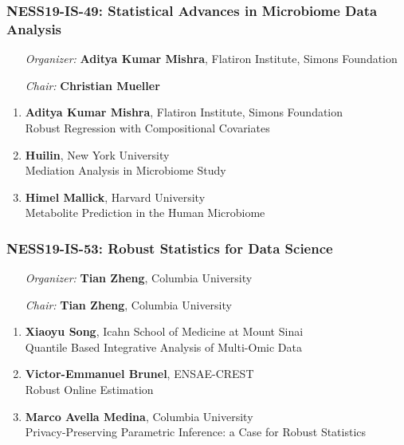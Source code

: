 \subsubsection*{NESS19-IS-49: Statistical Advances in Microbiome Data Analysis}

\begin{enumerate}[align=left]
\item [\emph{Organizer:}] \textbf{Aditya Kumar Mishra}, Flatiron Institute, Simons Foundation \\
\item [\emph{Chair:}] \textbf{Christian Mueller}
\end{enumerate}

\begin{enumerate}
\item \textbf{Aditya Kumar Mishra}, Flatiron Institute, Simons Foundation \\
Robust Regression with Compositional Covariates
\item \textbf{Huilin}, New York University \\
Mediation Analysis in Microbiome Study
\item \textbf{Himel Mallick}, Harvard University \\
Metabolite Prediction in the Human Microbiome
\end{enumerate}

\subsubsection*{NESS19-IS-53: Robust Statistics for Data Science}

\begin{enumerate}[align=left]
\item [\emph{Organizer:}] \textbf{Tian Zheng}, Columbia University \\
\item [\emph{Chair:}] \textbf{Tian Zheng}, Columbia University
\end{enumerate}

\begin{enumerate}
\item \textbf{Xiaoyu Song}, Icahn School of Medicine at Mount Sinai \\
Quantile Based Integrative Analysis of Multi-Omic Data
\item \textbf{Victor-Emmanuel Brunel}, ENSAE-CREST \\
Robust Online Estimation
\item \textbf{Marco Avella Medina}, Columbia University \\
Privacy-Preserving Parametric Inference: a Case for Robust Statistics
\end{enumerate}

